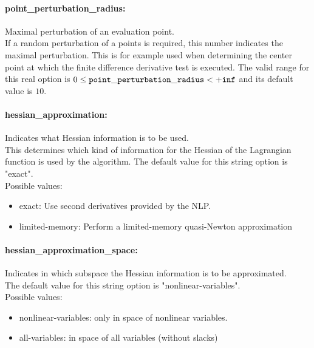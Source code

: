 \paragraph{point\_perturbation\_radius:}\label{sec:point_perturbation_radius} Maximal perturbation of an evaluation point. $\;$ \\
 If a random perturbation of a points is required,
this number indicates the maximal perturbation. 
This is for example used when determining the
center point at which the finite difference
derivative test is executed. The valid range for this real option is 
$0 \le {\tt point\_perturbation\_radius } <  {\tt +inf}$
and its default value is $10$.


\paragraph{hessian\_approximation:}\label{sec:hessian_approximation} Indicates what Hessian information is to be used. $\;$ \\
 This determines which kind of information for the
Hessian of the Lagrangian function is used by the
algorithm.
The default value for this string option is "exact".
\\ 
Possible values:
\begin{itemize}
   \item exact: Use second derivatives provided by the NLP.
   \item limited-memory: Perform a limited-memory quasi-Newton
approximation
\end{itemize}

\paragraph{hessian\_approximation\_space:}\label{sec:hessian_approximation_space} Indicates in which subspace the Hessian information is to be approximated. $\;$ \\

The default value for this string option is "nonlinear-variables".
\\ 
Possible values:
\begin{itemize}
   \item nonlinear-variables: only in space of nonlinear variables.
   \item all-variables: in space of all variables (without slacks)
\end{itemize}

